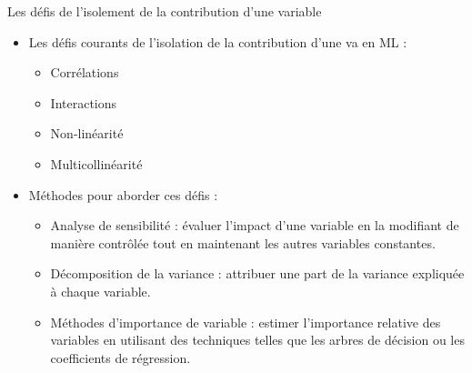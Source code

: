 \documentclass{beamer}
\begin{document}
\begin{frame}{Les défis de l'isolement de la contribution d'une variable}
	\begin{itemize}
		\item Les défis courants de l'isolation de la contribution d'une va en ML :
		\begin{itemize}
			\item Corrélations 
			\item Interactions 
			\item Non-linéarité 
			\item Multicollinéarité
		\end{itemize}
		\item Méthodes pour aborder ces défis :
		\begin{itemize}
			\item Analyse de sensibilité : évaluer l'impact d'une variable en la modifiant de manière contrôlée tout en maintenant les autres variables constantes.
			\item Décomposition de la variance : attribuer une part de la variance expliquée à chaque variable.
			\item Méthodes d'importance de variable : estimer l'importance relative des variables en utilisant des techniques telles que les arbres de décision ou les coefficients de régression.
		\end{itemize}
	\end{itemize}
\end{frame}
\end{document}
